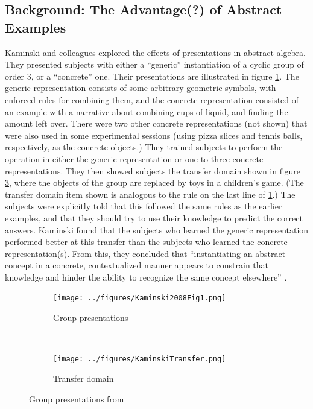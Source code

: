 \documentclass[man,10pt]{apa6}
\begin{document}
\subsection{Background: The Advantage(?) of Abstract Examples}
Kaminski and colleagues \cite{Kaminski2008} explored the effects of presentations in abstract algebra. They presented subjects with either a ``generic'' instantiation of a cyclic group of order 3, or a ``concrete'' one. Their presentations are illustrated in figure \ref{kaminskitraining}. The generic representation consists of some arbitrary geometric symbols, with enforced rules for combining them, and the concrete representation consisted of an example with a narrative about combining cups of liquid, and finding the amount left over. There were two other concrete representations (not shown) that were also used in some experimental sessions (using pizza slices and tennis balls, respectively, as the concrete objects.) They trained subjects to perform the operation in either the generic representation or one to three concrete representations. They then showed subjects the transfer domain shown in figure \ref{kaminskitransfer}, where the objects of the group are replaced by toys in a children's game. (The transfer domain item shown is analogous to the rule on the last line of \ref{kaminskitraining}.) The subjects were explicitly told that this followed the same rules as the earlier examples, and that they should try to use their knowledge to predict the correct answers. Kaminski found that the subjects who learned the generic representation performed better at this transfer than the subjects who learned the concrete representation(s). From this, they concluded that ``instantiating an abstract concept in a concrete, contextualized manner appears to constrain that knowledge and hinder the ability to recognize the same concept elsewhere'' \cite{Kaminski2008}. \par
\begin{figure} \centering \begin{subfigure}{0.5\textwidth} \caption{Group presentations} \label{kaminskitraining} \texttt{[image: ../figures/Kaminski2008Fig1.png]} \end{subfigure} \\ \begin{subfigure}{0.5\textwidth} \caption{Transfer domain} \label{kaminskitransfer} \texttt{[image: ../figures/KaminskiTransfer.png]} \end{subfigure} \caption{Group presentations from \cite{Kaminski2008}} \end{figure}\noindent
\end{document}
